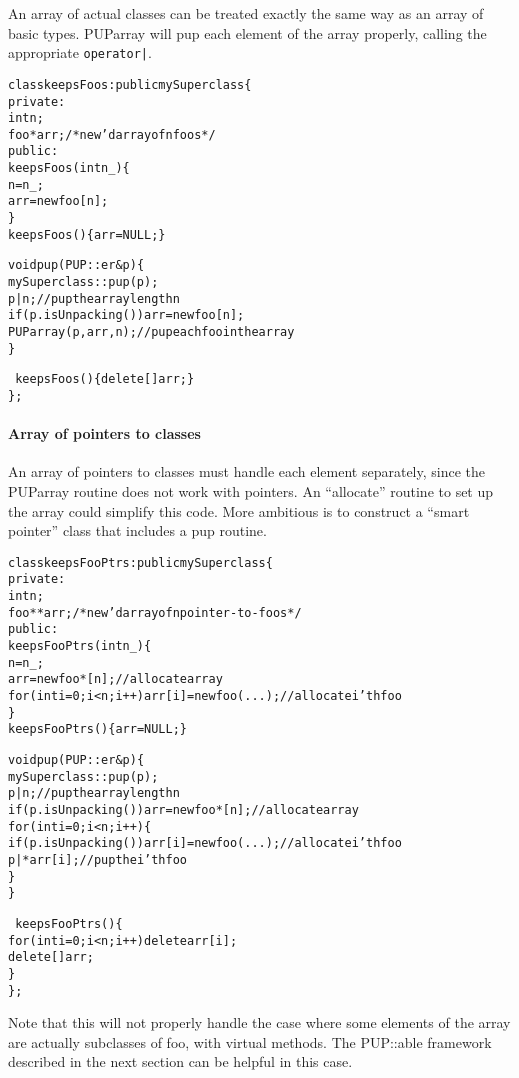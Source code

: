 An array of actual classes can be treated exactly the same way
as an array of basic types.  PUParray will pup each 
element of the array properly, calling the appropriate \verb.operator|..
\begin{alltt}
class keepsFoos : public mySuperclass \{
private:
    int n;
    foo *arr;/*new'd array of n foos*/
public:
    keepsFoos(int n_) \{
      n=n_;
      arr=new foo[n];
    \}
    keepsFoos() \{ arr=NULL; \} 
    
    void pup(PUP::er &p) \{
      mySuperclass::pup(p);
      p|n;//pup the array length n
      if (p.isUnpacking())  arr=new foo[n];
      PUParray(p,arr,n); //pup each foo in the array
    \}
    
    ~keepsFoos() \{delete[] arr;\}
\};
\end{alltt}


\paragraph{Array of pointers to classes}

An array of pointers to classes must handle each element
separately, since the PUParray routine does not work with 
pointers.  An ``allocate'' routine to set up the array
could simplify this code.  More ambitious is to construct
a ``smart pointer'' class that includes a pup routine.
\begin{alltt}
class keepsFooPtrs : public mySuperclass \{
private:
    int n;
    foo **arr;/*new'd array of n pointer-to-foos*/
public:
    keepsFooPtrs(int n_) \{
      n=n_;
      arr=new foo*[n]; // allocate array
      for (int i=0;i<n;i++) arr[i]=new foo(...); // allocate i'th foo
    \}
    keepsFooPtrs() \{ arr=NULL; \} 
    
    void pup(PUP::er &p) \{
      mySuperclass::pup(p);
      p|n;//pup the array length n
      if (p.isUnpacking()) arr=new foo*[n]; // allocate array
      for (int i=0;i<n;i++) \{
        if (p.isUnpacking()) arr[i]=new foo(...); // allocate i'th foo
        p|*arr[i];  //pup the i'th foo
      \}
    \}
    
    ~keepsFooPtrs() \{
       for (int i=0;i<n;i++) delete arr[i];
       delete[] arr;
     \}
\};
\end{alltt}

Note that this will not properly handle the case where
some elements of the array are actually subclasses of foo,
with virtual methods.  The PUP::able framework described
in the next section can be helpful in this case.


